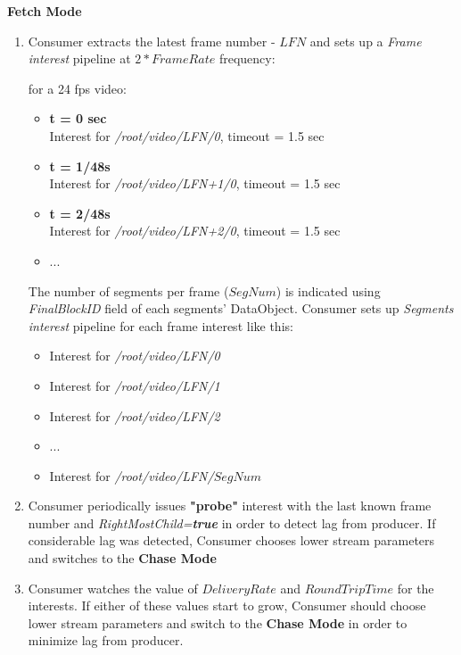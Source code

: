 \documentclass[12pt]{article}
\begin{document}
\textbf{Fetch Mode}
\begin{enumerate}
\item Consumer extracts the latest frame number - $LFN$ and sets up a \textit{Frame interest} pipeline at $2*FrameRate$ frequency:
\begin{center}
for a 24 fps video:
\begin{itemize}
\item \textbf{t = 0 sec} \\
Interest for \textit{/root/video/LFN/0}, timeout = 1.5 sec
\item \textbf{t = 1/48s} \\
Interest for \textit{/root/video/LFN+1/0}, timeout = 1.5 sec
\item \textbf{t = 2/48s} \\
Interest for \textit{/root/video/LFN+2/0}, timeout = 1.5 sec
\item ...
\end{itemize}
\end{center}

The number of segments per frame ($SegNum$) is indicated using \textit{FinalBlockID} field of each segments' DataObject. Consumer sets up \textit{Segments interest} pipeline for each frame interest like this: 
\begin{center}
\begin{itemize}
\item Interest for \textit{/root/video/LFN/0}
\item Interest for \textit{/root/video/LFN/1}
\item Interest for \textit{/root/video/LFN/2}
\item ...
\item Interest for \textit{/root/video/LFN/$SegNum$}
\end{itemize}
\end{center}

\item Consumer periodically issues \textbf{"probe"} interest with the last known frame number and \textit{RightMostChild=\textbf{true}} in order to detect lag from producer. If considerable lag was detected, Consumer chooses lower stream parameters and switches to the \textbf{Chase Mode}

\item Consumer watches the value of $DeliveryRate$ and $RoundTripTime$ for the interests. If either of these values start to grow, Consumer should choose lower stream parameters and switch  to the \textbf{Chase Mode} in order to minimize lag from producer.

\end{enumerate}
\end{document}
